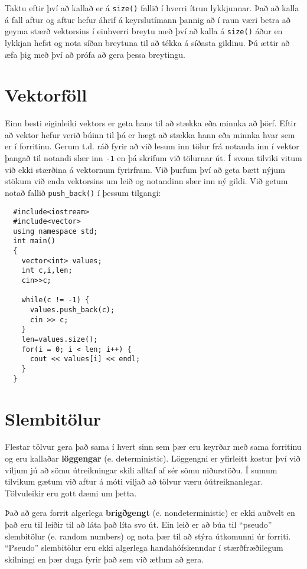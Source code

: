 Taktu eftir því að kallað er á {\tt size()} fallið í hverri ítrun lykkjunnar.
Það að kalla á fall aftur og aftur hefur áhrif á keyrslutímann þannig að í raun væri betra að geyma stærð vektorsins í einhverri breytu með því að kalla á 
{\tt size()} áður en lykkjan hefst og nota síðan breytuna til að tékka á síðasta gildinu.
Þú ættir að æfa þig með því að prófa að gera þessa breytingu.

\section{Vektorföll}

Einn besti eiginleiki vektors er geta hans til að stækka eða minnka að þörf.
Eftir að vektor hefur verið búinn til þá er hægt að stækka hann eða minnka hvar sem er í forritinu.
Gerum t.d. ráð fyrir að við lesum inn tölur frá notanda inn í vektor þangað til notandi slær inn {\tt -1} en þá skrifum við tölurnar út.
Í svona tilviki vitum við ekki stærðina á vektornum fyrirfram.
Við þurfum því að geta bætt nýjum stökum við enda vektorsins um leið og notandinn slær inn ný gildi.
Við getum notað fallið {\tt push\_back()} í þessum tilgangi:

\begin{verbatim}
  #include<iostream>
  #include<vector>
  using namespace std;
  int main()
  {
    vector<int> values;
    int c,i,len;
    cin>>c;
    
    while(c != -1) {
      values.push_back(c);
      cin >> c;
    }
    len=values.size();
    for(i = 0; i < len; i++) {
      cout << values[i] << endl;
    }
  }

\end{verbatim}

\section{Slembitölur}
\label{random}
\label{pseudorandom}

Flestar tölvur gera það sama í hvert sinn sem þær eru keyrðar með sama forritinu og eru kallaðar {\bf löggengar} (e. deterministic). 
Löggengni er yfirleitt kostur því við viljum jú að sömu útreikningar skili alltaf af sér sömu niðurstöðu.
Í sumum tilvikum gætum við aftur á móti viljað að tölvur væru óútreiknanlegar.  Tölvuleikir eru gott dæmi um þetta.

Það að gera forrit algerlega {\bf brigðgengt} (e. nondeterministic) er ekki auðvelt en það eru til leiðir til að láta það líta svo út.
Ein leið er að búa til ``pseudo'' slembitölur (e. random numbers) og nota þær til að stýra útkomunni úr forriti.
``Pseudo'' slembitölur eru ekki algerlega handahófskenndar í stærðfræðilegum skilningi en þær duga fyrir það sem við ætlum að gera.

